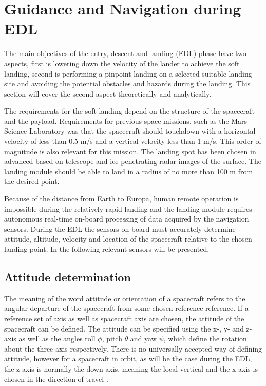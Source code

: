 \section{Guidance and Navigation during EDL}

The main objectives of the entry, descent and landing (EDL) phase have two aspects, first is lowering down the velocity of the lander to achieve the soft landing, second is performing a pinpoint landing on a selected suitable landing site and avoiding the potential obstacles and hazards during the landing. This section will cover the second aspect theoretically and analytically. 

The requirements for the soft landing depend on the structure of the spacecraft and the payload. Requirements for previous space missions, such as the Mars Science Laboratory was that the spacecraft should touchdown with a horizontal velocity of less than 0.5 m/s and a vertical velocity less than 1 m/s. This order of magnitude is also relevant for this mission. The landing spot has been chosen in advanced based on telescope and ice-penetrating radar images of the surface. The landing module should be able to land in a radius of no more than 100 m from the desired point. 

Because of the distance from Earth to Europa, human remote operation is impossible during the relatively rapid landing and the landing module requires autonomous real-time on-board processing of data acquired by the navigation sensors. During the EDL the sensors on-board must accurately determine attitude, altitude, velocity and location of the spacecraft relative to the chosen landing point. In the following relevant sensors will be presented. 

\subsection{Attitude determination}

The meaning of the word attitude or orientation of a spacecraft refers to the angular departure of the spacecraft from some chosen reference reference. If a reference set of axis as well as spacecraft axis are chosen, the attitude of the spacecraft can be defined. The attitude can be specified using the x-, y- and z- axis as well as the angles roll $\phi$, pitch $\theta$ and yaw $\psi$, which define the rotation about the three axis respectively. There is no universally accepted way of defining attitude, however for a spacecraft in orbit, as will be the case during the EDL, the z-axis is normally the down axis, meaning the local vertical and the x-axis is chosen in the direction of travel \cite{spacecraft}.

